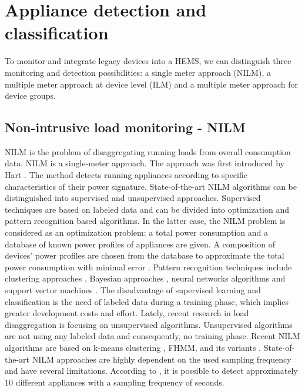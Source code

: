 \documentclass{article}
\begin{document}
\section{Appliance detection and classification}\label{sec:legacy}
To monitor and integrate legacy devices into a \ac{HEMS}, we can distinguish three monitoring and detection possibilities: a single meter approach (\ac{NILM}),
a multiple meter approach at device level (\ac{ILM}) and a multiple meter approach for device groups.

\subsection{Non-intrusive load monitoring - \ac{NILM}}\label{subsec:nilm}
\ac{NILM} is the problem of disaggregating running loads from overall consumption data.
\ac{NILM} is a single-meter approach.
The approach was first introduced by Hart \cite{Hart1992}.
The method detects running appliances according to specific characteristics of their power signature.
State-of-the-art \ac{NILM} algorithms can be distinguished into supervised and unsupervised approaches.
Supervised techniques are based on labeled data and can be divided into optimization and pattern recognition based algorithms.
In the latter case, the \ac{NILM} problem is considered as an optimization problem: a total power consumption and a database of known power profiles of appliances are given.
A composition of devices' power profiles are chosen from the database to approximate the total power consumption with minimal error \cite{Liang2010,Egarter2013,Suzuki2008}.
Pattern recognition techniques include clustering approaches \cite{Hart1992}, Bayesian approaches  \cite{Zeifman2012}, neural networks algorithms \cite{Srinivasan2006} and support vector machines \cite{Srinivasan2006,Lin2010}.
The disadvantage of supervised learning and classification is the need of labeled data during a training phase, which implies greater development costs and effort.
Lately, recent research in load disaggregation is focusing on unsupervised algorithms.
Unsupervised algorithms are not using any labeled data and consequently, no training phase.
Recent \ac{NILM} algorithms are based on k-means clustering \cite{goncalves_unsupervised_2011}, \ac{FHMM}, and its variants \cite{zico2012,Zaidi2010,Kim2011,Zoha2013}.
State-of-the-art \ac{NILM} approaches are highly dependent on the used sampling frequency and have several limitations.
According to \cite{CarrieArmel2013}, it is possible to detect approximately $10$ different appliances with a sampling frequency of seconds.
\end{document}
